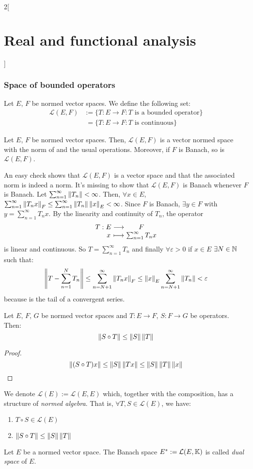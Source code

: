 \documentclass[../../../main_math.tex]{subfiles}
\begin{document}
\begin{multicols}{2}[\section{Real and functional analysis}]
  \subsubsection{Space of bounded operators}
  \begin{definition}
    Let $E$, $F$ be normed vector spaces. We define the following set:
    \begin{align*}
      \mathcal{L}(E,F) & := \{T:E\rightarrow F: T\text{ is a bounded operator}\}            \\
                       & \;=                   \{T:E\rightarrow F: T\text{ is continuous}\}
    \end{align*}
  \end{definition}
  \begin{theorem}
    Let $E$, $F$ be normed vector spaces. Then, $\mathcal{L}(E,F)$ is a vector normed space with the norm of  and the usual operations. Moreover, if $F$ is Banach, so is $\mathcal{L}(E,F)$.
  \end{theorem}
  \begin{sproof}
    An easy check shows that $\mathcal{L}(E,F)$ is a vector space and that the associated norm is indeed a norm. It's missing to show that $\mathcal{L}(E,F)$ is Banach whenever $F$ is Banach. Let $\sum_{n=1}^\infty\left\|T_n\right\|<\infty$. Then, $\forall x\in E$, $\sum_{n=1}^\infty\left\|T_nx\right\|_F\leq \sum_{n=1}^\infty\left\|T_n\right\|\left\|x\right\|_E<\infty$. Since $F$ is Banach, $\exists y\in F$ with $y=\sum_{n=1}^\infty T_nx$. By the linearity and continuity of $T_n$, the operator
    $$\function{T}{E}{F}{x}{\sum_{n=1}^\infty T_nx}$$
    is linear and continuous. So $T=\sum_{n=1}^\infty T_n$ and finally $\forall \varepsilon>0$ if $x\in E$ $\exists N\in\mathbb{N}$ such that:
    $$\left\|T-\sum_{n=1}^N T_n\right\|\leq \sum_{n=N+1}^\infty \left\|T_n x\right\|_F\leq \left\|x\right\|_E\sum_{n=N+1}^\infty \left\|T_n\right\|<\varepsilon$$
    because is the tail of a convergent series.
  \end{sproof}
  \begin{proposition}
    Let $E$, $F$, $G$ be normed vector spaces and $T:E\rightarrow F$, $S:F\rightarrow G$ be operators. Then: $$\left\|S\circ T\right\|\leq\left\|S\right\|\left\|T\right\|$$
  \end{proposition}
  \begin{proof}
    $$\left\|(S\circ T)x\right\|\leq \left\|S\right\|\left\|Tx\right\|\leq \left\|S\right\|\left\|T\right\|\left\|x\right\|$$
  \end{proof}
  \begin{definition}
    We denote $\mathcal{L}(E):=\mathcal{L}(E,E)$ which, together with the composition, has a structure of \emph{normed algebra}. That is, $\forall T,S\in\mathcal{L}(E)$, we have:
    \begin{enumerate}
      \item $T\circ S\in\mathcal{L}(E)$
      \item $\left\|S\circ T\right\|\leq\left\|S\right\|\left\|T\right\|$
    \end{enumerate}
  \end{definition}
  \begin{definition}
    Let $E$ be a normed vector space. The Banach space $E^*:=\mathcal{L}(E,\mathbb{K})$ is called \emph{dual space} of $E$.
  \end{definition}

\end{multicols}
\end{document}
